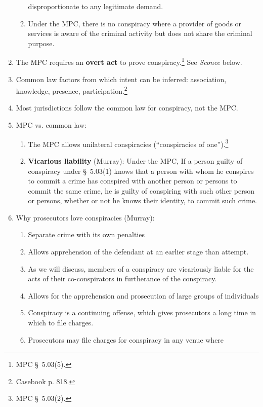 \begin{enumerate}
\begin{enumerate}
        disproportionate to any legitimate demand.
        \item Under the MPC, there is no conspiracy where a provider of goods 
        or services is aware of the criminal activity but does not share the 
        criminal purpose.
    \end{enumerate}
    \item The MPC requires an \textbf{overt act} to prove 
    conspiracy.\footnote{MPC \S\ 5.03(5).} See \emph{Sconce} below.
    \item Common law factors from which intent can be inferred: association, 
    knowledge, presence, participation.\footnote{Casebook p. 818.}
    \item Most jurisdictions follow the common law for conspiracy, not the 
    MPC.
    \item MPC vs. common law:
    \begin{enumerate}
        \item The MPC allows unilateral conspiracies (``conspiracies of 
        one'').\footnote{MPC \S\ 5.03(2).}
        \item \textbf{Vicarious liability} (Murray): Under the MPC, If a person guilty of 
        conspiracy under \S\ 5.03(1) knows that a person with whom he conspires to 
        commit a crime has conspired with another person or persons to commit the 
        same crime, he is guilty of conspiring with such other person or persons, 
        whether or not he knows their identity, to commit such crime.
    \end{enumerate}
    \item Why prosecutors love conspiracies (Murray):
    \begin{enumerate}
        \item Separate crime with its own penalties
        \item Allows apprehension of the defendant at an earlier stage than 
        attempt.
        \item As we will discuss, members of a conspiracy are vicariously 
        liable for the acts of their co-conspirators in furtherance of the 
        conspiracy.
        \item Allows for the apprehension and prosecution of large groups of 
        individuals \item Conspiracy is a continuing offense, which gives 
        prosecutors a long time in which to file charges.
        \item Prosecutors may file charges for conspiracy in any venue where 

\end{enumerate}
\end{enumerate}

